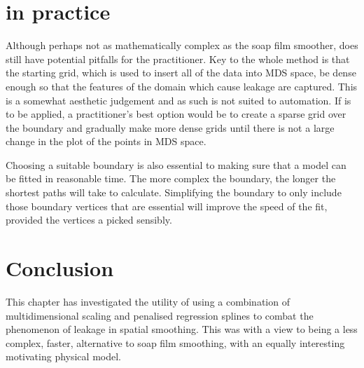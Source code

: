 \section{\mdsap in practice}

Although perhaps not as mathematically complex as the soap film smoother, \mdsap does still have potential pitfalls for the practitioner. Key to the whole method is that the starting grid, which is used to insert all of the data into MDS space, be dense enough so that the features of the domain which cause leakage are captured. This is a somewhat aesthetic judgement and as such is not suited to automation. If \mdsap is to be applied, a practitioner's best option would be to create a sparse grid over the boundary and gradually make more dense grids until there is not a large change in the plot of the points in MDS space.

Choosing a suitable boundary is also essential to making sure that a model can be fitted in reasonable time. The more complex the boundary, the longer the shortest paths will take to calculate. Simplifying the boundary to only include those boundary vertices that are essential will improve the speed of the fit, provided the vertices a picked sensibly.


\section{Conclusion}

This chapter has investigated the utility of using a combination of multidimensional scaling and penalised regression splines to combat the phenomenon of leakage in spatial smoothing. This was with a view to \mdsap being a less complex, faster, alternative to soap film smoothing, with an equally interesting motivating physical model.






